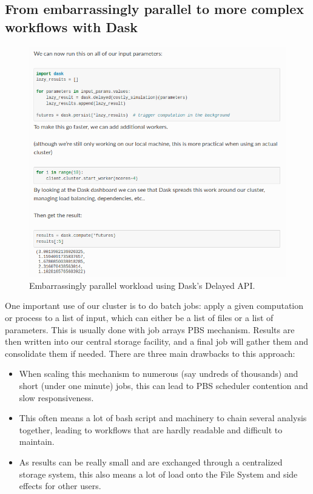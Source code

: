 \documentclass{article}
\begin{document}
\subsection{From embarrassingly parallel to more complex workflows with Dask}
\label{ssec:usecase1}

\begin{figure}
  \centering
  \includegraphics[width=\columnwidth]{ep_dask_code.png}
  \caption{\label{ep_dask_code} Embarrassingly parallel workload using Dask's Delayed API.}
\end{figure}

One important use of our cluster is to do batch jobs: apply a given computation or process to a list of input, which can either be a list of files or a list of parameters. This is usually done with job arrays PBS mechanism. Results are then written into our central storage facility, and a final job will gather them and consolidate them if needed. There are three main drawbacks to this approach:
\begin{itemize}
\item When scaling this mechanism to numerous (say undreds of thousands) and short (under one minute) jobs, this can lead to PBS scheduler contention and slow responsiveness.
\item This often means a lot of bash script and machinery to chain several analysis together, leading to workflows that are hardly readable and difficult to maintain.
\item As results can be really small and are exchanged through a centralized storage system, this also means a lot of load onto the File System and side effects for other users.
\end{itemize}
\end{document}
